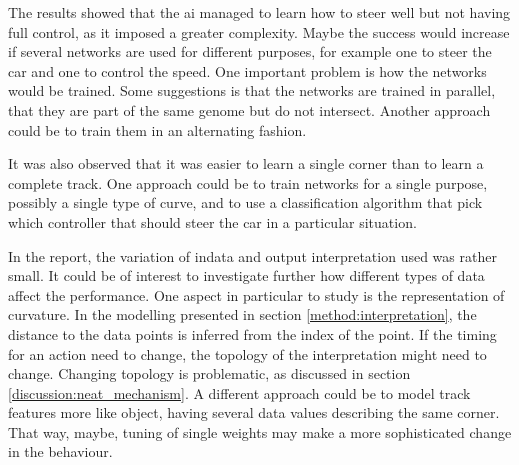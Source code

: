 The results showed that the ai managed to learn how to steer well but not having full control, as it imposed a greater complexity. Maybe the success would increase if several networks are used for different purposes, for example one to steer the car and one to control the speed. One important problem is how the networks would be trained. Some suggestions is that the networks are trained in parallel, that they are part of the same genome but do not intersect. Another approach could be to train them in an alternating fashion.

It was also observed that it was easier to learn a single corner than to learn a complete track. One approach could be to train networks for a single purpose, possibly a single type of curve, and to use a classification algorithm that pick which controller that should steer the car in a particular situation.

In the report, the variation of indata and output interpretation used was rather small. It could be of interest to investigate further how different types of data affect the performance. One aspect in particular to study is the representation of curvature. In the modelling presented in section \ref{method:interpretation}, the distance to the data points is inferred from the index of the point. If the timing for an action need to change, the topology of the interpretation might need to change. Changing topology is problematic, as discussed in section \ref{discussion:neat_mechanism}. A different approach could be to model track features more like object, having several data values describing the same corner. That way, maybe, tuning of single weights may make a more sophisticated change in the behaviour. 








